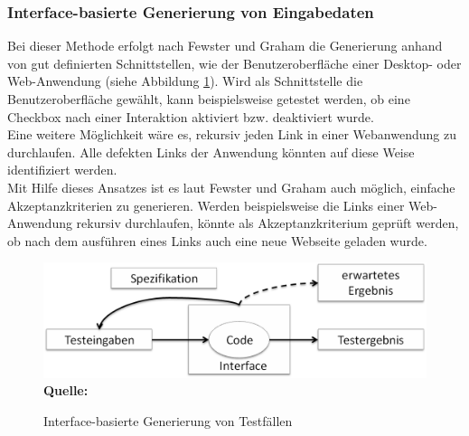 \subsubsection{Interface-basierte Generierung von Eingabedaten}
\label{subsubsec:interfacebasierte_generierung}
Bei dieser Methode erfolgt nach Fewster und Graham \cite[vgl. S. 20]{fewster_software_1999} die Generierung anhand von gut definierten Schnittstellen, wie der Benutzeroberfläche einer Desktop- oder Web-Anwendung (siehe Abbildung \ref{fig:interfaceBasedDesign}). 
Wird als Schnittstelle die Benutzeroberfläche gewählt, kann beispielsweise getestet werden, ob eine Checkbox nach einer Interaktion aktiviert bzw. deaktiviert wurde.\\
Eine weitere Möglichkeit wäre es, rekursiv jeden Link in einer Webanwendung zu durchlaufen. Alle defekten Links der Anwendung könnten auf diese Weise identifiziert werden.\\
Mit Hilfe dieses Ansatzes ist es laut Fewster und Graham \cite[vgl. S. 21]{fewster_software_1999} auch möglich, einfache Akzeptanzkriterien zu generieren. Werden beispielsweise die Links einer Web-Anwendung rekursiv durchlaufen, könnte als Akzeptanzkriterium geprüft werden, ob nach dem ausführen eines Links auch eine neue Webseite geladen wurde.

\begin{figure}[htb]
  \centering  
  \includegraphics[scale=0.6]{img/interfaceBasedDesign.png}\\
  \footnotesize\sffamily\textbf{Quelle:} \cite[vgl. S. 20]{fewster_software_1999}
  \caption{Interface-basierte Generierung von Testfällen}
  \label{fig:interfaceBasedDesign}
\end{figure}


